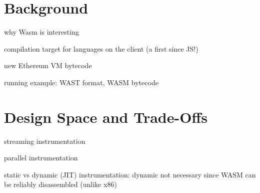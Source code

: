 \documentclass[sigplan,review,anonymous]{acmart}\settopmatter{printfolios=true,printccs=false,printacmref=false}
\begin{document}
%
%		
%

\newpage
\section{Background}
\label{sec:background}

why Wasm is interesting

compilation target for languages on the client (a first since JS!)

new Ethereum VM bytecode

running example: WAST format, WASM bytecode

\newpage
\section{Design Space and Trade-Offs}
\label{sec:design}

streaming instrumentation

parallel instrumentation

static vs dynamic (JIT) instrumentation: dynamic not necessary since WASM can be reliably disassembled (unlike x86)
\end{document}
